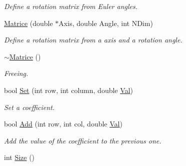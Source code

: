 \begin{DoxyCompactItemize}
\begin{DoxyCompactList}\small\item\em \-Define a rotation matrix from \-Euler angles. \end{DoxyCompactList}\item 
\hypertarget{classMatrice_a9acb38f7eeb5f9c61aa9f79928912e7f}{\hyperlink{classMatrice_a9acb38f7eeb5f9c61aa9f79928912e7f}{\-Matrice} (double $\ast$\-Axis, double \-Angle, int \-N\-Dim)}\label{classMatrice_a9acb38f7eeb5f9c61aa9f79928912e7f}

\begin{DoxyCompactList}\small\item\em \-Define a rotation matrix from a axis and a rotation angle. \end{DoxyCompactList}\item 
\hypertarget{classMatrice_a7c102b4f9b38e5975567e561581f38de}{\hyperlink{classMatrice_a7c102b4f9b38e5975567e561581f38de}{$\sim$\-Matrice} ()}\label{classMatrice_a7c102b4f9b38e5975567e561581f38de}

\begin{DoxyCompactList}\small\item\em \-Freeing. \end{DoxyCompactList}\item 
\hypertarget{classMatrice_a3caf89cd6f9ccd16fcdc6a6c57039c2f}{bool \hyperlink{classMatrice_a3caf89cd6f9ccd16fcdc6a6c57039c2f}{\-Set} (int row, int column, double \hyperlink{classMatrice_a2a233d9af97c320a1b372ededf056886}{\-Val})}\label{classMatrice_a3caf89cd6f9ccd16fcdc6a6c57039c2f}

\begin{DoxyCompactList}\small\item\em \-Set a coefficient. \end{DoxyCompactList}\item 
\hypertarget{classMatrice_aa0c2a276b9a17b75e9d689bbda62b1b5}{bool \hyperlink{classMatrice_aa0c2a276b9a17b75e9d689bbda62b1b5}{\-Add} (int row, int col, double \hyperlink{classMatrice_a2a233d9af97c320a1b372ededf056886}{\-Val})}\label{classMatrice_aa0c2a276b9a17b75e9d689bbda62b1b5}

\begin{DoxyCompactList}\small\item\em \-Add the value of the coefficient to the previous one. \end{DoxyCompactList}\item 
\hypertarget{classMatrice_af40990b9bd3d70d30e8ce7cdda1ad56f}{int \hyperlink{classMatrice_af40990b9bd3d70d30e8ce7cdda1ad56f}{\-Size} ()}\label{classMatrice_af40990b9bd3d70d30e8ce7cdda1ad56f}


\end{DoxyCompactItemize}
